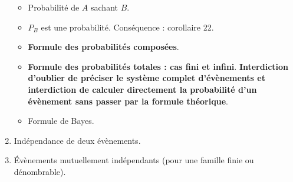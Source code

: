 \documentclass[twoside,a4paper,french,10pt]{VcCours}
\begin{document}
\begin{enumerate}
  \begin{itemize}
  \item Probabilité de $A$ sachant $B$.
  \item $P_B$ est une probabilité. Conséquence : corollaire 22.
  \item \textbf{Formule des probabilités composées}.
  \item \textbf{Formule des probabilités totales : cas fini et infini}. \textbf{Interdiction d'oublier de préciser le système complet d'évènements et interdiction de calculer directement la probabilité d'un évènement sans passer par la formule théorique}.
  \item Formule de Bayes.
  \end{itemize}
  \item Indépendance de deux évènements. 
  \item Évènements mutuellement indépendants (pour une famille finie ou dénombrable).
  \end{enumerate}
  
\end{document}
